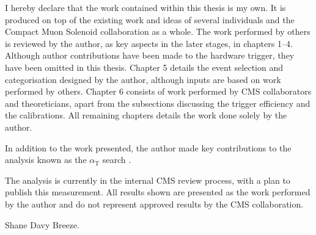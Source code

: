 \begin{declaration}%
%
I hereby declare that the work contained within this thesis is my own. It is
produced on top of the existing work and ideas of several individuals and the
Compact Muon Solenoid collaboration as a whole. The work performed by others
is reviewed by the author, as key aspects in the later stages, in chapters 1--4. Although author contributions have been made to the hardware
trigger, they have been omitted in this thesis. Chapter 5 details the event
selection and categorisation designed by the author, although inputs are based
on work performed by others. Chapter 6 consists of work performed by CMS
collaborators and theoreticians, apart from the subsections discussing the
\ptmiss trigger efficiency and the \ptmiss calibrations. All remaining
chapters details the work done solely by the author.

In addition to the work presented, the author made key contributions to the analysis known as the $\alpha_{\mathrm{T}}$ search \cite{Sirunyan:2018vjp}.

The analysis is currently in the internal CMS review process, with a plan to
publish this measurement. All results shown are presented as the work
performed by the author and do not represent approved results by the CMS
collaboration.

\mbox{}\hfill Shane Davy Breeze.
%
\end{declaration}%